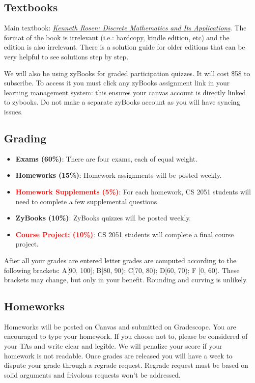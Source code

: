 \documentclass{article}
\begin{document}
\subsection*{Textbooks}
    Main textbook: \textit{\href{https://www.amazon.com/Discrete-Mathematics-Applications-Kenneth-author-dp-1260091996/dp/1260091996/ref=dp_ob_title_bk}{Kenneth Rosen: Discrete Mathematics and Its Applications}}. The format of the book is irrelevant (i.e.: hardcopy, kindle edition, etc) and the edition is also irrelevant. There is a solution guide for older editions that can be very helpful to see solutions step by step.
    
    \vspace{3mm}
    We will also be using zyBooks for graded participation quizzes. It will cost \$58 to subscribe. To access it you must click any zyBooks assignment link in your learning management system: this ensures your canvas account is directly linked to zybooks.  Do not make a separate zyBooks account as you will have syncing issues.

\subsection*{Grading}
    \begin{itemize}
        \item \textbf{Exams (60\%)}: There are four exams, each of equal weight.
        \item \textbf{Homeworks (15\%)}: Homework assignments will be posted weekly.
        \item \textcolor{red}{\textbf{Homework Supplements (5\%)}:} For each homework, CS 2051 students will need to complete a few supplemental questions.
        \item \textbf{ZyBooks (10\%)}: ZyBooks quizzes will be posted weekly.
        \item \textcolor{red}{\textbf{Course Project: (10\%)}}: CS 2051 students will complete a final course project.
    \end{itemize}
    After all your grades are entered letter grades are computed according to the following brackets: A[90, 100]; B[80, 90); C[70, 80); D[60, 70); F [0, 60). These brackets may change, but only in your benefit. Rounding and curving is unlikely.

\subsection*{Homeworks}
    Homeworks will be posted on Canvas and submitted on Gradescope. You are encouraged to type your homework. If you choose not to, please be considered of your TAs and write clear and legible. We will penalize your score if your homework is not readable. Once grades are released you will have a week to dispute your grade through a regrade request. Regrade request must be based on solid arguments and frivolous requests won’t be addressed.
\end{document}
